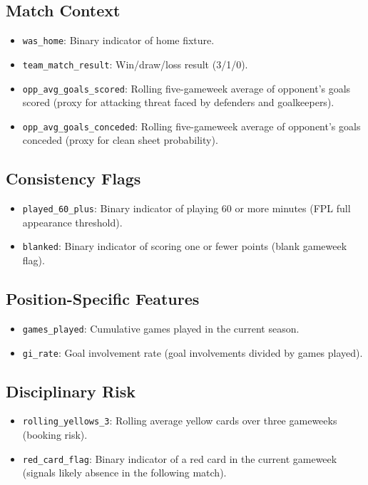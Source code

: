 \documentclass[11pt,english,listoffigures,listoftables]{tfgetsinf}
\begin{document}
\subsection{Match Context}
\begin{itemize}
    \item \texttt{was\_home}: Binary indicator of home fixture.
    \item \texttt{team\_match\_result}: Win/draw/loss result (3/1/0).
    \item \texttt{opp\_avg\_goals\_scored}: Rolling five-gameweek average of opponent's goals scored (proxy for attacking threat faced by defenders and goalkeepers).
    \item \texttt{opp\_avg\_goals\_conceded}: Rolling five-gameweek average of opponent's goals conceded (proxy for clean sheet probability).
\end{itemize}

\subsection{Consistency Flags}
\begin{itemize}
    \item \texttt{played\_60\_plus}: Binary indicator of playing 60 or more minutes (FPL full appearance threshold).
    \item \texttt{blanked}: Binary indicator of scoring one or fewer points (blank gameweek flag).
\end{itemize}

\subsection{Position-Specific Features}
\begin{itemize}
    \item \texttt{games\_played}: Cumulative games played in the current season.
    \item \texttt{gi\_rate}: Goal involvement rate (goal involvements divided by games played).
\end{itemize}

\subsection{Disciplinary Risk}
\begin{itemize}
    \item \texttt{rolling\_yellows\_3}: Rolling average yellow cards over three gameweeks (booking risk).
    \item \texttt{red\_card\_flag}: Binary indicator of a red card in the current gameweek (signals likely absence in the following match).
\end{itemize}
\end{document}
